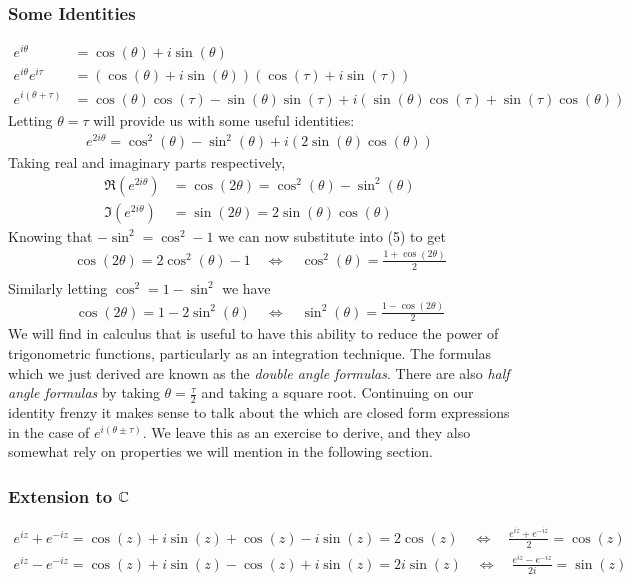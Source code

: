 \subsubsection{Some Identities}
\begin{align}
	e^{i\theta} &= \cos(\theta) + i\sin(\theta)\\
	e^{i\theta}e^{i\tau} &= (\cos(\theta) + i\sin(\theta))(\cos(\tau)+i\sin(\tau))\\
	e^{i(\theta+\tau)} &= \cos(\theta)\cos(\tau)-\sin(\theta)\sin(\tau)+i(\sin(\theta)\cos(\tau) + \sin(\tau)\cos(\theta))
\end{align}
Letting $\theta = \tau$ will provide us with some useful identities:
\begin{align}
	e^{2i\theta} = \cos^{2}(\theta)-\sin^{2}(\theta)+i(2\sin(\theta)\cos(\theta))
\end{align}
Taking real and imaginary parts respectively,
\begin{align}
	\Re(e^{2i\theta}) &= \cos(2\theta) = \cos^{2}(\theta) - \sin^{2}(\theta)\\
	\Im(e^{2i\theta}) &= \sin(2\theta) = 2\sin(\theta)\cos(\theta)
\end{align}
Knowing that $-\sin^{2} = \cos^{2} - 1$ we can now substitute into (5) to get
\begin{align}
	\cos(2\theta) = 2\cos^{2}(\theta) - 1 \quad \iff \quad \cos^{2}(\theta) = \frac{1 + \cos(2\theta)}{2}\\
\end{align}
Similarly letting $\cos^2 = 1 - \sin^2$ we have
\begin{align}
	\cos(2\theta) = 1 - 2\sin^{2}(\theta) \quad \iff \quad \sin^{2}(\theta) = \frac{1-\cos(2\theta)}{2}
\end{align}
We will find in calculus that is useful to have this ability to reduce the power of trigonometric functions, particularly as an integration technique.
The formulas which we just derived are known as the \textit{double angle formulas}. There are also \textit{half angle formulas} by taking $\theta = \frac{\tau}{2}$ and taking a square root.
Continuing on our identity frenzy it makes sense to talk about the  which are closed form expressions in the case of $e^{i (\theta \pm \tau)}$. We leave this as an exercise to derive, and they also somewhat rely on properties we will mention in the following section.

\subsubsection{Extension to $\mathbb{C}$}
\begin{align*}
	e^{iz} + e^{-iz}= \cos(z) + i\sin(z) + \cos(z) - i\sin(z) = 2\cos(z) \quad \iff \quad \frac{e^{iz}+e^{-iz}}{2} = \cos(z)\\
	e^{iz} - e^{-iz} = \cos(z) + i\sin(z) - \cos(z) + i\sin(z) = 2i\sin(z) \quad \iff \quad \frac{e^{iz}-e^{-iz}}{2i} = \sin(z)
\end{align*}
